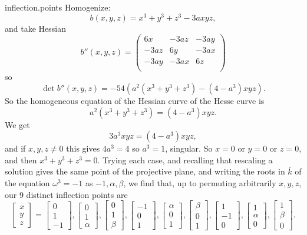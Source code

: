 \begin{answer}{inflection.points}
Homogenize:
\[
b(x,y,z)=x^3+y^3+z^3-3axyz,
\]
and take Hessian
\[
b''(x,y,z)
=
\begin{pmatrix}
6x&-3az&-3ay\\
-3az&6y&-3ax\\
-3ay&-3ax&6z\\
\end{pmatrix}
\]
so
\[
\det b''(x,y,z)=-54(a^2(x^3+y^3+z^3)-(4-a^3)xyz).
\]
So the homogeneous equation of the Hessian curve of the Hesse curve is
\[
a^2(x^3+y^3+z^3)=(4-a^3)xyz.
\]
We get
\[
3a^3xyz=(4-a^3)xyz,
\]
and if \(x,y,z\ne 0\) this gives \(4a^3=4\) so \(a^3=1\), singular.
So \(x=0\) or \(y=0\) or \(z=0\), and then \(x^3+y^3+z^3=0\).
Trying each case, and recalling that rescaling a solution gives the same point of the projective plane, and writing the roots in \(\bar{k}\) of the equation \(\omega^3=-1\) as \(-1,\alpha,\beta\), we find that, up to permuting arbitrarily \(x,y,z\), our \(9\) distinct inflection points are
\[
\begin{bmatrix}
x\\
y\\
z
\end{bmatrix}
=
\begin{bmatrix}
0\\
1\\
-1
\end{bmatrix},
\begin{bmatrix}
0\\
1\\
\alpha
\end{bmatrix},
\begin{bmatrix}
0\\
1\\
\beta
\end{bmatrix},
\begin{bmatrix}
-1\\
0\\
1
\end{bmatrix},
\begin{bmatrix}
\alpha\\
0\\
1
\end{bmatrix},
\begin{bmatrix}
\beta\\
0\\
1
\end{bmatrix},
\begin{bmatrix}
1\\
-1\\
0
\end{bmatrix},
\begin{bmatrix}
1\\
\alpha\\
0
\end{bmatrix},
\begin{bmatrix}
1\\
\beta\\
0
\end{bmatrix}.
\]
\end{answer}

